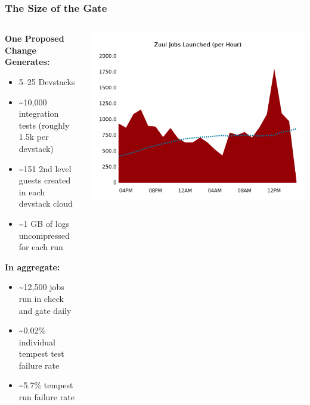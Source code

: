 \documentclass[aspectratio=169,11pt,hyperref={colorlinks=true}]{beamer}
\begin{document}
\begin{frame}
\frametitle{The Size of the Gate}
    \begin{columns}
        \begin{column}{.48\textwidth}
            \textbf{One Proposed Change Generates:}
            \begin{itemize}
                \item 5--25 Devstacks
                \item \textasciitilde10,000 integration tests (roughly 1.5k per devstack)
                \item \textasciitilde151 2nd level guests created in each devstack cloud
                \item \textasciitilde1 GB of logs uncompressed for each run
            \end{itemize}
            \textbf{In aggregate:}
            \begin{itemize}
                \item \textasciitilde12,500 jobs run in check and gate daily
                \item \textasciitilde0.02\% individual tempest test failure rate
                \item \textasciitilde5.7\% tempest run failure rate
            \end{itemize}
        \end{column}
        \begin{column}{.48\textwidth}
            \includegraphics[width=\textwidth]{zuul_all_jobs.png}
        \end{column}
    \end{columns}
\end{frame}
\end{document}
